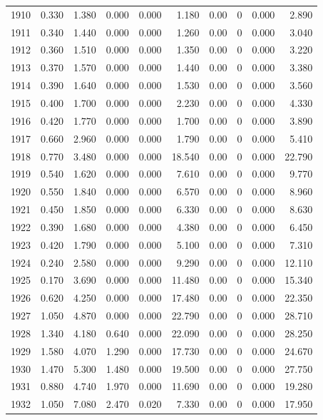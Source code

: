 \documentclass[
]{scrartcl}
\begin{document}
\begin{longtable}{rrrrrrrrrr}
1910 & 0.330 & 1.380 & 0.000 & 0.000 & 1.180 & 0.00 & 0 & 0.000 & 2.890 \\ 
1911 & 0.340 & 1.440 & 0.000 & 0.000 & 1.260 & 0.00 & 0 & 0.000 & 3.040 \\ 
1912 & 0.360 & 1.510 & 0.000 & 0.000 & 1.350 & 0.00 & 0 & 0.000 & 3.220 \\ 
1913 & 0.370 & 1.570 & 0.000 & 0.000 & 1.440 & 0.00 & 0 & 0.000 & 3.380 \\ 
1914 & 0.390 & 1.640 & 0.000 & 0.000 & 1.530 & 0.00 & 0 & 0.000 & 3.560 \\ 
1915 & 0.400 & 1.700 & 0.000 & 0.000 & 2.230 & 0.00 & 0 & 0.000 & 4.330 \\ 
1916 & 0.420 & 1.770 & 0.000 & 0.000 & 1.700 & 0.00 & 0 & 0.000 & 3.890 \\ 
1917 & 0.660 & 2.960 & 0.000 & 0.000 & 1.790 & 0.00 & 0 & 0.000 & 5.410 \\ 
1918 & 0.770 & 3.480 & 0.000 & 0.000 & 18.540 & 0.00 & 0 & 0.000 & 22.790 \\ 
1919 & 0.540 & 1.620 & 0.000 & 0.000 & 7.610 & 0.00 & 0 & 0.000 & 9.770 \\ 
1920 & 0.550 & 1.840 & 0.000 & 0.000 & 6.570 & 0.00 & 0 & 0.000 & 8.960 \\ 
1921 & 0.450 & 1.850 & 0.000 & 0.000 & 6.330 & 0.00 & 0 & 0.000 & 8.630 \\ 
1922 & 0.390 & 1.680 & 0.000 & 0.000 & 4.380 & 0.00 & 0 & 0.000 & 6.450 \\ 
1923 & 0.420 & 1.790 & 0.000 & 0.000 & 5.100 & 0.00 & 0 & 0.000 & 7.310 \\ 
1924 & 0.240 & 2.580 & 0.000 & 0.000 & 9.290 & 0.00 & 0 & 0.000 & 12.110 \\ 
1925 & 0.170 & 3.690 & 0.000 & 0.000 & 11.480 & 0.00 & 0 & 0.000 & 15.340 \\ 
1926 & 0.620 & 4.250 & 0.000 & 0.000 & 17.480 & 0.00 & 0 & 0.000 & 22.350 \\ 
1927 & 1.050 & 4.870 & 0.000 & 0.000 & 22.790 & 0.00 & 0 & 0.000 & 28.710 \\ 
1928 & 1.340 & 4.180 & 0.640 & 0.000 & 22.090 & 0.00 & 0 & 0.000 & 28.250 \\ 
1929 & 1.580 & 4.070 & 1.290 & 0.000 & 17.730 & 0.00 & 0 & 0.000 & 24.670 \\ 
1930 & 1.470 & 5.300 & 1.480 & 0.000 & 19.500 & 0.00 & 0 & 0.000 & 27.750 \\ 
1931 & 0.880 & 4.740 & 1.970 & 0.000 & 11.690 & 0.00 & 0 & 0.000 & 19.280 \\ 
1932 & 1.050 & 7.080 & 2.470 & 0.020 & 7.330 & 0.00 & 0 & 0.000 & 17.950 \\ 

\end{longtable}
\end{document}
